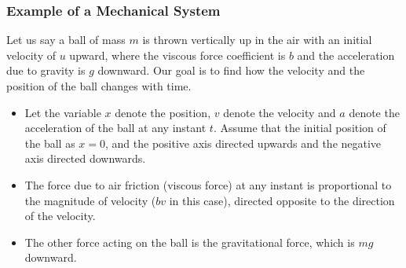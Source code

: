 \documentclass[10pt]{beamer}
\begin{document}
\begin{frame}
    \frametitle{Example of a Mechanical System}
    Let us say a ball of mass $m$ is thrown vertically up in the air with an initial velocity of $u$ upward, where the viscous force coefficient is $b$ and the acceleration due to gravity is $g$ downward. Our goal is to find how the velocity and the position of the ball changes with time.
    \begin{itemize}
        \item Let the variable $x$ denote the position, $v$ denote the velocity and $a$ denote the acceleration of the ball at any instant $t$. Assume that the initial position of the ball as $x = 0$, and the positive axis directed upwards and the negative axis directed downwards.
        \item The force due to air friction (viscous force) at any instant is proportional to the magnitude of velocity ($bv$ in this case), directed opposite to the direction of the velocity.
        \item The other force acting on the ball is the gravitational force, which is $mg$ downward.
    \end{itemize}
\end{frame}
\end{document}
